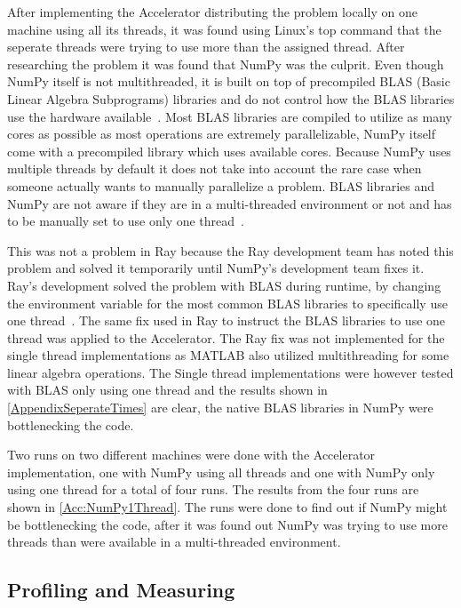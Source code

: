 \documentclass[12pt, a4paper]{article}
\begin{document}
After implementing the Accelerator distributing the problem locally on one machine using all its threads, it was found using Linux's top command that the seperate threads were trying to use more than the assigned thread.
After researching the problem it was found that NumPy was the culprit.
Even though NumPy itself is not multithreaded, it is built on top of precompiled BLAS (Basic Linear Algebra Subprograms) libraries and do not control how the BLAS libraries use the hardware available~\cite{Numpy:OpenBLAS}.
Most BLAS libraries are compiled to utilize as many cores as possible as most operations are extremely parallelizable, NumPy itself come with a precompiled library which uses available cores.
Because NumPy uses multiple threads by default it does not take into account the rare case when someone actually wants to manually parallelize a problem. 
BLAS libraries and NumPy are not aware if they are in a multi-threaded environment or not and has to be manually set to use only one thread~\cite{OpenBLAS:threadSafe}.

This was not a problem in Ray because the Ray development team has noted this problem and solved it temporarily until NumPy's development team fixes it.
Ray's development solved the problem with BLAS during runtime, by changing the environment variable for the most common BLAS libraries to specifically use one thread~\cite{ray:OMPNUMTHREAD}. 
The same fix used in Ray to instruct the BLAS libraries to use one thread was applied to the Accelerator.
The Ray fix was not implemented for the single thread implementations as MATLAB also utilized multithreading for some linear algebra operations.
The Single thread implementations were however tested with BLAS only using one thread and the results shown in \cref{AppendixSeperateTimes} are clear, the native BLAS libraries in NumPy were bottlenecking the code.

Two runs on two different machines were done with the Accelerator implementation, one with NumPy using all threads and one with NumPy only using one thread for a total of four runs.
The results from the four runs are shown in \cref{Acc:NumPy1Thread}.
The runs were done to find out if NumPy might be bottlenecking the code, after it was found out NumPy was trying to use more threads than were available in a multi-threaded environment.

\subsection{Profiling and Measuring}
\end{document}
